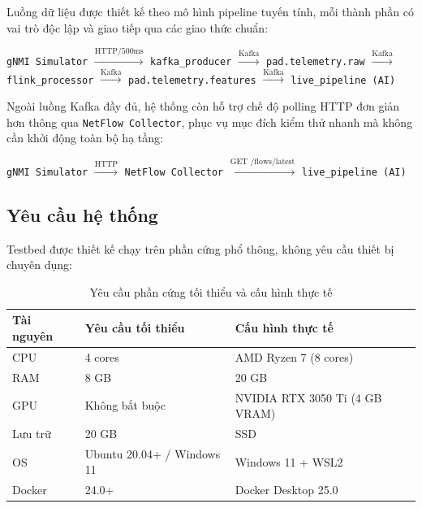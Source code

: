 \documentclass[12pt,a4paper]{article}
\begin{document}
Luồng dữ liệu được thiết kế theo mô hình pipeline tuyến tính, mỗi thành phần có vai trò độc lập và giao tiếp qua các giao thức chuẩn:

\begin{center}
\small
\texttt{gNMI Simulator} $\xrightarrow{\text{HTTP/500ms}}$
\texttt{kafka\_producer} $\xrightarrow{\text{Kafka}}$
\texttt{pad.telemetry.raw} $\xrightarrow{\text{Kafka}}$
\texttt{flink\_processor} $\xrightarrow{\text{Kafka}}$
\texttt{pad.telemetry.features} $\xrightarrow{\text{Kafka}}$
\texttt{live\_pipeline (AI)}
\end{center}

\vspace{0.5em}
\noindent Ngoài luồng Kafka đầy đủ, hệ thống còn hỗ trợ chế độ polling HTTP đơn giản hơn thông qua \texttt{NetFlow Collector}, phục vụ mục đích kiểm thử nhanh mà không cần khởi động toàn bộ hạ tầng:

\begin{center}
\small
\texttt{gNMI Simulator} $\xrightarrow{\text{HTTP}}$
\texttt{NetFlow Collector} $\xrightarrow{\text{GET /flows/latest}}$
\texttt{live\_pipeline (AI)}
\end{center}

\subsection{Yêu cầu hệ thống}

Testbed được thiết kế chạy trên phần cứng phổ thông, không yêu cầu thiết bị chuyên dụng:

\begin{table}[H]
\centering
\caption{Yêu cầu phần cứng tối thiểu và cấu hình thực tế}
\label{tab:hardware}
\begin{tabular}{lll}
\toprule
\textbf{Tài nguyên} & \textbf{Yêu cầu tối thiểu} & \textbf{Cấu hình thực tế} \\
\midrule
CPU  & 4 cores & AMD Ryzen 7 (8 cores) \\
RAM  & 8 GB   & 20 GB \\
GPU  & Không bắt buộc & NVIDIA RTX 3050 Ti (4 GB VRAM) \\
Lưu trữ & 20 GB & SSD \\
OS   & Ubuntu 20.04+ / Windows 11 & Windows 11 + WSL2 \\
Docker & 24.0+ & Docker Desktop 25.0 \\
\bottomrule
\end{tabular}
\end{table}

\end{document}
